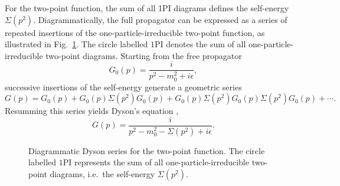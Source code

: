 For the two-point function, the sum of all 1PI diagrams defines
the self-energy $\Sigma(p^2)$.
Diagrammatically, the full propagator can be expressed as a series of
repeated insertions of the one-particle-irreducible two-point function,
as illustrated in Fig.~\ref{fig:dyson_series}. The circle labelled
$1\mathrm{PI}$ denotes the sum of all one-particle-irreducible
two-point diagrams. Starting from the free propagator
\begin{equation}
G_0(p) = \frac{i}{p^2 - m_0^2 + i\epsilon},
\end{equation}
successive insertions of the self-energy generate a geometric series
\begin{equation}
G(p)
=
G_0(p) + G_0(p)\Sigma(p^2)G_0(p)
+ G_0(p)\Sigma(p^2)G_0(p)\Sigma(p^2)G_0(p) + \cdots .
\end{equation}
Resumming this series yields Dyson's equation
\cite{Dyson1949},
\begin{equation}
G(p)
=
\frac{i}{p^2 - m_0^2 - \Sigma(p^2) + i\epsilon}.
\label{eq:Dyson_appendix}
\end{equation}

\begin{figure}[htbp]
\centering
{}
\caption{Diagrammatic Dyson series for the two-point function. The
circle labelled $1\mathrm{PI}$ represents the sum of all
one-particle-irreducible two-point diagrams, i.e.\ the self-energy
$\Sigma(p^2)$.}
\label{fig:dyson_series}
\end{figure}

